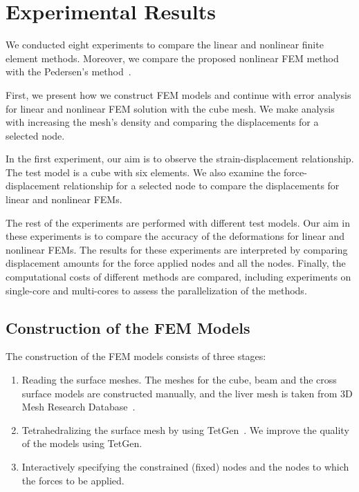 \chapter{Experimental Results}
\label{chapter6}

We conducted eight experiments to compare the linear and nonlinear finite element methods. Moreover, we compare the proposed nonlinear FEM method with the Pedersen's method~\cite{Pedersen06}.

First, we present how we construct FEM models and continue with error analysis for linear and nonlinear FEM solution with the cube mesh. We make analysis with increasing the mesh's density and comparing the displacements for a selected node.

In the first experiment, our aim is to observe the strain-displacement relationship. The test model is a cube with  six elements. We also examine the force-displacement relationship for a selected node to compare the displacements for linear and nonlinear FEMs.

The rest of the experiments are performed with different test models. Our aim in these experiments is to compare the accuracy of the deformations for linear and nonlinear FEMs. The results for these experiments are interpreted by comparing displacement amounts for the force applied nodes and all the nodes. Finally, the computational costs of different methods are compared, including experiments on single-core and multi-cores to assess the parallelization of the methods.

\section{Construction of the FEM Models}

The construction of the FEM models consists of three stages:

\begin{enumerate}
\item Reading the surface meshes. The meshes for the cube, beam and the cross surface models are constructed manually, and the liver mesh is taken from 3D Mesh Research Database~\cite{Liver2011}.

\item Tetrahedralizing the surface mesh by using TetGen~\cite{Tetgen2011}. We improve the quality of the models using TetGen.

\item Interactively specifying the constrained (fixed) nodes and the nodes to which the forces to be applied.
\end{enumerate}

